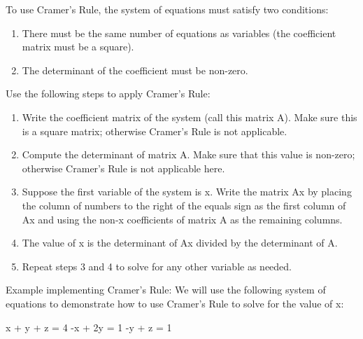 \documentclass[11pt]{book}
\begin{document}
To use Cramer's Rule, the system of equations must satisfy two conditions:
\begin{enumerate}
	\item There must be the same number of equations as variables (the coefficient matrix must be a square).
	\item The determinant of the coefficient must be non-zero.
\end{enumerate}

Use the following steps to apply Cramer's Rule:
\begin{enumerate}
	\item Write the coefficient matrix of the system (call this matrix A). Make sure this is a square matrix; otherwise Cramer's Rule is not applicable.
	\item Compute the determinant of matrix A. Make sure that this value is non-zero; otherwise Cramer's Rule is not applicable here.
	\item Suppose the first variable of the system is x. Write the matrix Ax by placing the column of numbers to the right of the equals sign as the first column of Ax and using the non-x coefficients of matrix A as the remaining columns.
	\item The value of x is the determinant of Ax divided by the determinant of A.
	\item Repeat steps 3 and 4 to solve for any other variable as needed.
\end{enumerate}

Example implementing Cramer's Rule:
We will use the following system of equations to demonstrate how to use Cramer's Rule to solve for the value of x:

\begin{center}
x + y + z = 4
-x + 2y = 1
-y + z = 1
\end{center}
\end{document}
